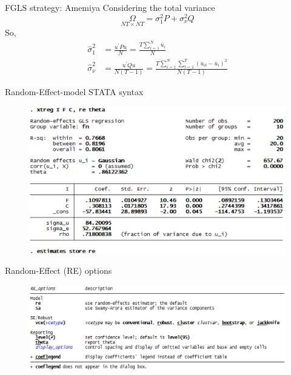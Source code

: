 \begin{frame}{FGLS strategy: Amemiya}
	Considering the total variance%
		$$\underset{NT\times NT}{\Omega }=\sigma _{1}^{2}P+\sigma _{\nu }^{2}Q$$
	So, 
		\begin{align*}
			\widehat{\sigma}_{1}^{2} & = \frac{u^{\prime}Pu}{N}=\frac{T\sum_{i=1}^{N}
										 \overline{u}_{i}}{N} \\
			\widehat{\sigma}_{\nu}^{2} & = \frac{u^{\prime }Qu}{N\left(T-1\right) }=
											\frac{T\sum_{i=1}^{N}\sum_{t=1}^{T}\left( u_{it}-\overline{u}_{i}\right) ^{2}
											}{N\left( T-1\right) }
		\end{align*}
\end{frame}
\begin{frame}{Random-Effect-model STATA syntax}
		\begin{figure}
			\centering
			\includegraphics[width = 0.85\linewidth]{figures/panel_07.png}
		\end{figure}
\end{frame}
\begin{frame}{Random-Effect (RE) options}
		\begin{figure}
			\centering
			\includegraphics[width = \linewidth]{figures/panel_08.png}
		\end{figure}
\end{frame}
